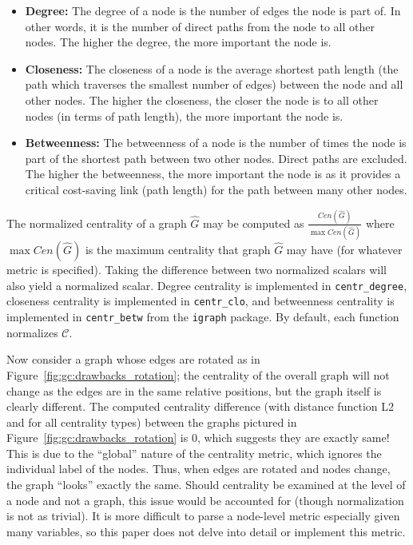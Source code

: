 \tablespacing
\begin{itemize}
	\item \textbf{Degree:} The degree of a node is the number of edges the node 
	is part of. In other words, it is the number of direct paths from the node 
	to all other nodes. The higher the degree, the more important the node 
	is.
	\item \textbf{Closeness:} The closeness of a node is the average 
	shortest path length (the path which traverses the smallest number of 
	edges) between the node and all other nodes. The higher the closeness, 
	the closer the node is to all other nodes (in terms of path length), the 
	more important the node is.
	\item \textbf{Betweenness:} The betweenness of a node is the number of 
	times the node is part of the shortest path between two other nodes. Direct 
	paths are excluded. The higher the betweenness, the more important the node 
	is as it provides a critical cost-saving link (path length) for the path 
	between many other nodes. 
\end{itemize}
\bodyspacing

The normalized centrality of a graph $\hat{G}$ may be computed as 	
$\frac{Cen(\hat{G})}{\max Cen(\hat{G})}$ where $\max Cen(\hat{G})$ is the 
maximum centrality that graph $\hat{G}$ may have (for whatever metric is 
specified). Taking the difference between two normalized scalars will also 
yield a normalized scalar.
Degree centrality is implemented in \texttt{centr\_degree}, 
closeness centrality is implemented in \texttt{centr\_clo}, and betweenness 
centrality is implemented in \texttt{centr\_betw} from the \texttt{igraph} 
package. By default, each function normalizes $\mathcal{C}$.

Now consider a graph whose edges are rotated as in 
Figure~\ref{fig:gc:drawbacks_rotation}; the centrality of the overall graph 
will not change as the edges are in the same relative positions, but the graph 
itself is clearly different. The computed centrality difference (with distance 
function L2 and for all centrality types) between the graphs pictured in 
Figure~\ref{fig:gc:drawbacks_rotation} is 0, which suggests they are exactly 
same! This is due to the ``global'' nature of the centrality metric, which 
ignores the individual label of the nodes. Thus, when edges are rotated and 
nodes change, the graph ``looks'' exactly the same.
Should centrality be examined at the level of a node and not a graph, 
this issue would be accounted for (though normalization is not as trivial). It 
is more difficult to parse a node-level metric especially given many variables, 
so this paper does not delve into detail or implement this metric.

